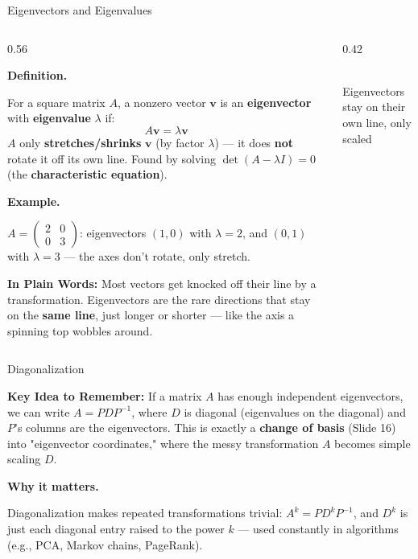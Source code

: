 \documentclass[9pt,aspectratio=169]{beamer}
\newcommand{\keyidea}[1]{%
\par\medskip\noindent\textbf{Key Idea to Remember:} #1\par\medskip}
\newcommand{\childex}[1]{%
\par\medskip\noindent\textbf{In Plain Words:} #1\par\medskip}
\begin{document}
\begin{frame}{Eigenvectors and Eigenvalues}
\footnotesize
\begin{columns}[T]
\begin{column}{0.56\textwidth}
\par\noindent\textbf{Definition.}\par
For a square matrix $A$, a nonzero vector $\mathbf{v}$ is an \textbf{eigenvector} with
\textbf{eigenvalue} $\lambda$ if:
\[ A\mathbf{v} = \lambda \mathbf{v} \]
$A$ only \textbf{stretches/shrinks} $\mathbf{v}$ (by factor $\lambda$) --- it does
\textbf{not} rotate it off its own line. Found by solving $\det(A-\lambda I)=0$
(the \textbf{characteristic equation}).
\medskip

\par\noindent\textbf{Example.}\par
$A=\begin{pmatrix}2&0\\0&3\end{pmatrix}$: eigenvectors $(1,0)$ with $\lambda=2$, and
$(0,1)$ with $\lambda=3$ --- the axes don't rotate, only stretch.
\medskip

\childex{Most vectors get knocked off their line by a transformation. Eigenvectors are the
rare directions that stay on the \textbf{same line}, just longer or shorter --- like the
axis a spinning top wobbles around.}
\end{column}
\begin{column}{0.42\textwidth}
\centering
{}
\\[0.3em]{\scriptsize Eigenvectors stay on their own line, only scaled}
\end{column}
\end{columns}
\end{frame}

\begin{frame}{Diagonalization}
\keyidea{If a matrix $A$ has enough independent eigenvectors, we can write
$A = PDP^{-1}$, where $D$ is diagonal (eigenvalues on the diagonal) and $P$'s columns are
the eigenvectors. This is exactly a \textbf{change of basis} (Slide 16) into "eigenvector
coordinates," where the messy transformation $A$ becomes simple scaling $D$.}

\par\noindent\textbf{Why it matters.}\par
Diagonalization makes repeated transformations trivial: $A^k = PD^kP^{-1}$, and $D^k$ is
just each diagonal entry raised to the power $k$ --- used constantly in algorithms
(e.g., PCA, Markov chains, PageRank).
\medskip

\end{frame}
\end{document}
